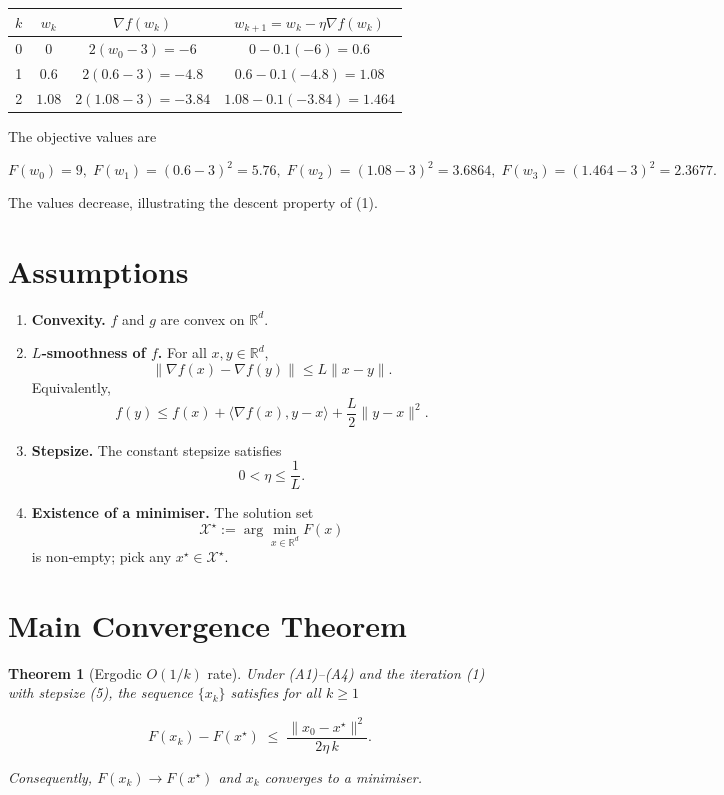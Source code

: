 \documentclass{article}
\newtheorem{theorem}{Theorem}
\newcommand{\R}{\mathbb{R}}
\begin{document}
\begin{center}
\begin{tabular}{c|c|c|c}
$k$ & $w_{k}$ & $\nabla f(w_{k})$ & $w_{k+1}=w_{k}-\eta\nabla f(w_{k})$ \\ \hline
0 & $0$ & $2(w_{0}-3)=-6$ & $0-0.1(-6)=0.6$ \\
1 & $0.6$ & $2(0.6-3)=-4.8$ & $0.6-0.1(-4.8)=1.08$ \\
2 & $1.08$ & $2(1.08-3)=-3.84$ & $1.08-0.1(-3.84)=1.464$ \\ 
\end{tabular}
\end{center}

The objective values are  

\[
F(w_{0})=9,\;F(w_{1})=(0.6-3)^{2}=5.76,\;F(w_{2})=(1.08-3)^{2}=3.6864,\;F(w_{3})=(1.464-3)^{2}=2.3677.
\]

The values decrease, illustrating the descent property of (1).

\newpage
\section*{Assumptions}

\begin{enumerate}
\item[(A1)] \textbf{Convexity.} $f$ and $g$ are convex on $\R^{d}$.
\item[(A2)] \textbf{$L$‑smoothness of $f$.} For all $x,y\in\R^{d}$,
\[
\|\nabla f(x)-\nabla f(y)\|\le L\|x-y\|.
\tag{3}
\]
Equivalently,
\[
f(y)\le f(x)+\langle\nabla f(x),y-x\rangle+\frac{L}{2}\|y-x\|^{2}.
\tag{4}
\]
\item[(A3)] \textbf{Stepsize.} The constant stepsize satisfies  
\[
0<\eta\le\frac{1}{L}.
\tag{5}
\]
\item[(A4)] \textbf{Existence of a minimiser.} The solution set
\[
\mathcal{X}^{\star}:=\arg\min_{x\in\R^{d}}F(x)
\]
is non‑empty; pick any $x^{\star}\in\mathcal{X}^{\star}$.
\end{enumerate}

\section*{Main Convergence Theorem}

\begin{theorem}[Ergodic $O(1/k)$ rate]\label{thm:rate}
Under (A1)–(A4) and the iteration (1) with stepsize (5), the sequence $\{x_{k}\}$ satisfies for all $k\ge1$  

\[
F(x_{k})-F(x^{\star})\;\le\;\frac{\|x_{0}-x^{\star}\|^{2}}{2\eta\,k}.
\tag{6}
\]

Consequently, $F(x_{k})\to F(x^{\star})$ and $x_{k}$ converges to a minimiser.
\end{theorem}
\end{document}
